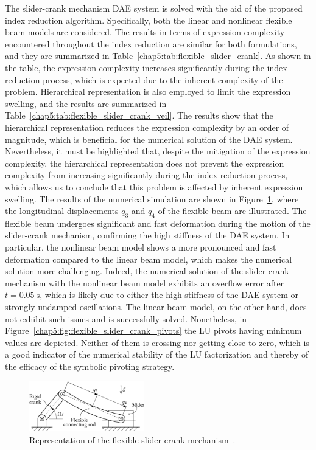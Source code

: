 The slider-crank mechanism \ac{DAE} system is solved with the aid of the proposed index reduction algorithm. Specifically, both the linear and nonlinear flexible beam models are considered. The results in terms of expression complexity encountered throughout the index reduction are similar for both formulations, and they are summarized in Table~\ref{chap5:tab:flexible_slider_crank}. As shown in the table, the expression complexity increases significantly during the index reduction process, which is expected due to the inherent complexity of the problem. Hierarchical representation is also employed to limit the expression swelling, and the results are summarized in Table~\ref{chap5:tab:flexible_slider_crank_veil}. The results show that the hierarchical representation reduces the expression complexity by an order of magnitude, which is beneficial for the numerical solution of the \ac{DAE} system. Nevertheless, it must be highlighted that, despite the mitigation of the expression complexity, the hierarchical representation does not prevent the expression complexity from increasing significantly during the index reduction process, which allows us to conclude that this problem is affected by inherent expression swelling. The results of the numerical simulation are shown in Figure~\ref{chap5:fig:flexible_slider_crank}, where the longitudinal displacements $q_3$ and $q_4$ of the flexible beam are illustrated. The flexible beam undergoes significant and fast deformation during the motion of the slider-crank mechanism, confirming the high stiffness of the \ac{DAE} system. In particular, the nonlinear beam model shows a more pronounced and fast deformation compared to the linear beam model, which makes the numerical solution more challenging. Indeed, the numerical solution of the slider-crank mechanism with the nonlinear beam model exhibits an overflow error after $t = \SI{0.05}{\second}$, which is likely due to either the high stiffness of the \ac{DAE} system or strongly undamped oscillations. The linear beam model, on the other hand, does not exhibit such issues and is successfully solved. Nonetheless, in Figure~\ref{chap5:fig:flexible_slider_crank_pivots} the \ac{LU} pivots having minimum values are depicted. Neither of them is crossing nor getting close to zero, which is a good indicator of the numerical stability of the \ac{LU} factorization and thereby of the efficacy of the symbolic pivoting strategy.

\begin{figure}[htb]
  \centering
  \includegraphics[width=5.0cm]{figures/chapter_5/flexible_slider_crank}
  \caption{Representation of the flexible slider-crank mechanism~\cite{lioen1998test, mazzia2008test}.}
  \label{chap5:fig:flexible_slider_crank}
\end{figure}

